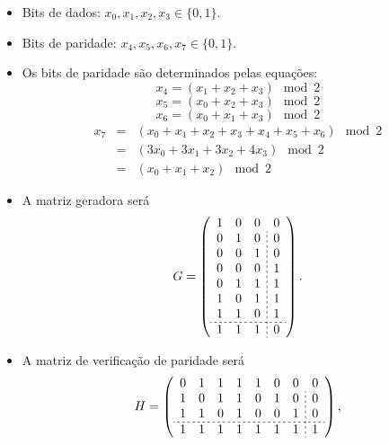 \begin{frame}[allowframebreaks]
  \begin{itemize}
    \item Bits de dados: $x_0, x_1, x_2, x_3 \in \{0,1\}$.
    \item Bits de paridade: $x_4, x_5, x_6, x_7 \in \{0,1\}$.
    \item Os bits de paridade são determinados pelas equações:
        \begin{equation}
        x_4 = (x_1 + x_2 + x_3) \mod 2
        \end{equation}
        \begin{equation}
        x_5 = (x_0 + x_2 + x_3) \mod 2
        \end{equation}
        \begin{equation}
        x_6 = (x_0 + x_1 + x_3) \mod 2
        \end{equation}
	\begin{eqnarray}
	x_7 &=& (x_0 + x_1 + x_2 + x_3 + x_4 + x_5 + x_6) \mod 2 \\
	    &=& (3 x_0 + 3 x_1 + 3 x_2 + 4 x_3 ) \mod 2 \\
	    &=& (x_0 + x_1 + x_2) \mod 2
	\end{eqnarray}	
    \item A matriz geradora será
        \begin{equation}
        G = 
	\left(
        \begin{array}{ccc;{2pt/2pt}c}
        1 & 0 & 0 & 0 \\
        0 & 1 & 0 & 0 \\
        0 & 0 & 1 & 0 \\
        0 & 0 & 0 & 1 \\
        0 & 1 & 1 & 1 \\
        1 & 0 & 1 & 1 \\
        1 & 1 & 0 & 1 \\ \hdashline[2pt/2pt]
        1 & 1 & 1 & 0
	\end{array}
	\right).
        \end{equation}

    \item A matriz de verificação de paridade será
        \begin{equation}\label{eq-Hmat844}
        H = 
        \left(
        \begin{array}{ccccccc;{2pt/2pt}c}
        0 & 1 & 1 & 1 & 1 & 0 & 0 & 0 \\
        1 & 0 & 1 & 1 & 0 & 1 & 0 & 0 \\
        1 & 1 & 0 & 1 & 0 & 0 & 1 & 0 \\ \hdashline[2pt/2pt]
        1 & 1 & 1 & 1 & 1 & 1 & 1 & 1
        \end{array}
        \right),
        \end{equation} 


\end{itemize}
\end{frame}
